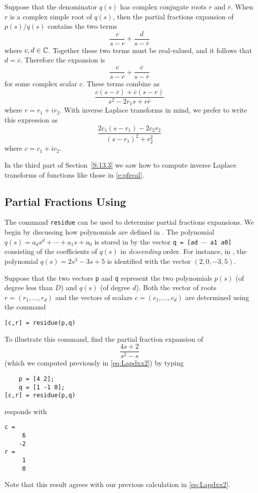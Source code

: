 \documentclass{ximera}
\begin{document}
Suppose that the denominator $q(s)$ has complex conjugate roots $r$ and 
$\overline{r}$.  When $r$ is a complex simple root of $q(s)$, then the 
partial fractions expansion of $p(s)/q(s)$ contains the two terms
\[
\frac{c}{s-r} + \frac{d}{s-\overline{r}}
\]
where $c,d\in\mbox{$\Bbb{C}$}$.  Together these two terms must be real-valued, and it 
follows that $d=\overline{c}$.  Therefore the expansion is 
\[
\frac{c}{s-r} + \frac{\overline{c}}{s-\overline{r}}
\]
for some complex scalar $c$.  These terms combine as
\[
\frac{c(s-\overline{r})+ \overline{c}(s-r)}{s^2-2r_1s+r\overline{r}}
\]
where $r=r_1+ir_2$.  With inverse Laplace transforms in mind, we prefer 
to write this expression as
\begin{equation}  \label{e:pfreal}
\frac{2c_1(s-r_1)-2c_2r_2}{(s-r_1)^2+r_2^2}
\end{equation}
where $c=c_1+ic_2$.  

In the third part of Section~\ref{S:13.3} we saw how to compute inverse 
Laplace transforms of functions like those in \eqref{e:pfreal}.



\subsection*{Partial Fractions Using \Matlab}

The \Matlab command {\tt residue} can be used to 
determine partial fractions
expansions.  We begin by discussing how polynomials are defined in \Matlabp.  
The polynomial $q(s)=a_ds^d+\cdots+a_1s+a_0$ is stored in \Matlab by the 
vector {\tt q = [ad $\cdots$ a1 a0]} consisting of the coefficients of $q(s)$ 
in {\em descending\/} order.  For instance, in \Matlabp, the polynomial 
$q(s)=2s^3 - 3s +5$ is identified with the vector $(2,0,-3,5)$.  

Suppose that the two vectors {\tt p} and {\tt q} represent the two polynomials 
$p(s)$ (of degree less than $D$) and $q(s)$ (of degree $d$).  Both the vector 
of roots $r=(r_1,\ldots,r_d)$ and the vectors of scalars $c=(c_1,\ldots,c_d)$ 
are determined using the command 
\begin{verbatim}
[c,r] = residue(p,q)
\end{verbatim}

To illustrate this command, find the partial fraction expansion of 
\[
\frac{4s+2}{s^2-s}
\]
(which we computed previously in \eqref{eq:Lapdxx2}) by typing
\begin{verbatim}
    p = [4 2];
    q = [1 -1 0];
[c,r] = residue(p,q)
\end{verbatim}
\Matlab responds with
\begin{verbatim}
c =
     6
    -2
r =
     1
     0
\end{verbatim}
Note that this result agrees with our previous calculation in \eqref{eq:Lapdxx2}.
\end{document}
